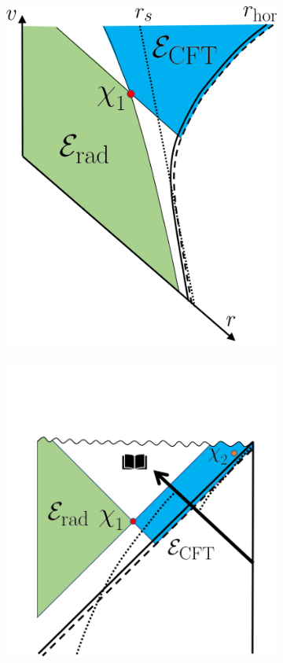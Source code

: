 \documentclass[11pt,a4paper]{article}
\begin{document}
\begin{figure}[t]
\begin{subfigure}{.48\textwidth}
  \centering
 \includegraphics[width = 0.65\linewidth]{BH_Eddington_LargeDiary.png}
\end{subfigure}
\begin{subfigure}{.48\textwidth}
  \centering
  \vspace{-2cm}
 \includegraphics[width = 0.9\linewidth]{BH_Penrose_LargeDiary.png}

\end{subfigure}
\end{figure}
\end{document}

